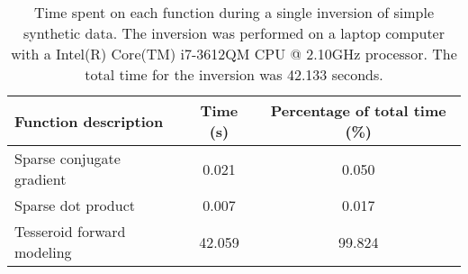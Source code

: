 
\begin{table}
    \centering
    \caption{
        Time spent on each function during a single inversion of
        simple synthetic data.
        The inversion was performed on a laptop computer with a
        Intel(R) Core(TM) i7-3612QM CPU @ 2.10GHz processor.
        The total time for the inversion was 42.133 seconds.
    }
    \label{profiling}
    \begin{tabular}{lcc}
        Function description & Time (s) & Percentage of total time (\%)\\
        \hline
        Sparse conjugate gradient & 0.021 & 0.050\\
        Sparse dot product & 0.007 & 0.017\\
        Tesseroid forward modeling & 42.059 & 99.824\\
        \hline
    \end{tabular}
\end{table}
